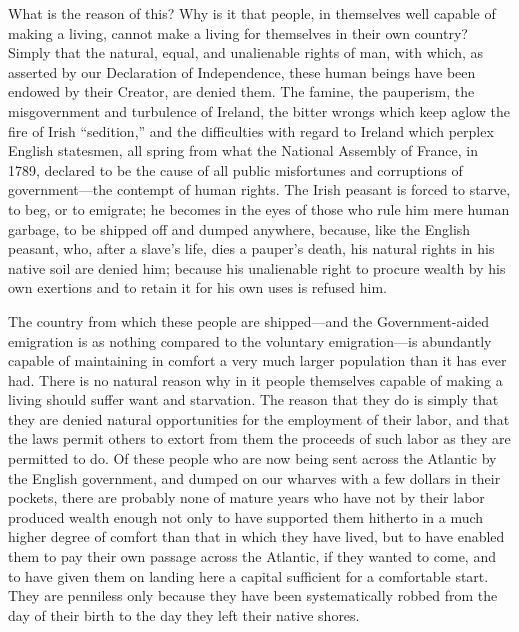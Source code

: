 \documentclass{book}
\begin{document}
What is the reason of this? Why is it that people, in themselves well capable of making a living, cannot make a living for themselves in their own country? Simply that the natural, equal, and unalienable rights of man, with which, as asserted by our Declaration of Independence, these human beings have been endowed by their Creator, are denied them. The famine, the pauperism, the misgovernment and turbulence of Ireland, the bitter wrongs which keep aglow the fire of Irish “sedition,” and the difficulties with regard to Ireland which perplex English statesmen, all spring from what the National Assembly of France, in 1789, declared to be the cause of all public misfortunes and corruptions of government—the contempt of human rights. The Irish peasant is forced to starve, to beg, or to emigrate; he becomes in the eyes of those who rule him mere human garbage, to be shipped off and dumped anywhere, because, like the English peasant, who, after a slave’s life, dies a pauper’s death, his natural rights in his native soil are denied him; because his unalienable right to procure wealth by his own exertions and to retain it for his own uses is refused him.

The country from which these people are shipped—and the Government-aided emigration is as nothing compared to the voluntary emigration—is abundantly capable of maintaining in comfort a very much larger population than it has ever had. There is no natural reason why in it people themselves capable of making a living should suffer want and starvation. The reason that they do is simply that they are denied natural opportunities for the employment of their labor, and that the laws permit others to extort from them the proceeds of such labor as they are permitted to do. Of these people who are now being sent across the Atlantic by the English government, and dumped on our wharves with a few dollars in their pockets, there are probably none of mature years who have not by their labor produced wealth enough not only to have supported them hitherto in a much higher degree of comfort than that in which they have lived, but to have enabled them to pay their own passage across the Atlantic, if they wanted to come, and to have given them on landing here a capital sufficient for a comfortable start. They are penniless only because they have been systematically robbed from the day of their birth to the day they left their native shores.
\end{document}
